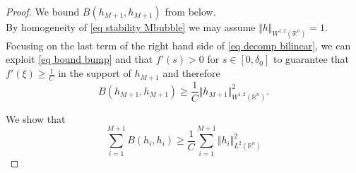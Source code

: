 \documentclass[11pt,letterpaper,reqno]{amsart}
\newcommand{\R}{\mathbb{R}}
\theoremstyle{plain}%
\theoremstyle{definition}
\numberwithin{equation}{section}
\numberwithin{figure}{section}
\begin{document}
\begin{proof}


 We bound $B(h_{M+1},h_{M+1})$ from below.\\

By homogeneity of \eqref{eq stability Mbubble} we may assume $\Vert  h\Vert_{W^{1,2}(\R^n)}=1$. Focusing on the last term of the right hand side of \eqref{eq decomp bilinear}, we can exploit \eqref{eq bound bump} and that $f'(s) >0$ for $s \in [0, \delta_0]$ to guarantee that $f'(\xi)\geq \frac{1}{C}$ in the support of $h_{M+1}$ and therefore
\begin{equation}\label{eq hM+1}
 B(h_{M+1},h_{M+1})\geq \frac{1}{C} \Vert h_{M+1}\Vert_{W^{1,2}(\R^n)}^2.
\end{equation}

\medskip

 We show that \begin{equation}\label{eq quadlb}
    \sum_{i=1}^{M+1}B(h_{i},h_{i})\geq \frac{1}{C} \sum_{i=1}^{M+1} \Vert h_i\Vert_{L^2(\R^n)}^2 
\end{equation}

\medskip


\end{proof}
\end{document}

